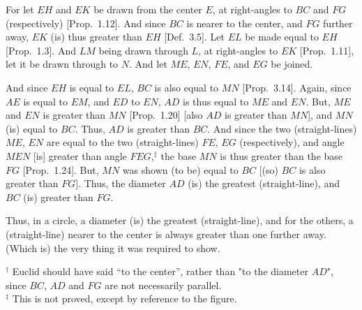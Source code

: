 \begin{Parallel}{}{}
{For let $EH$ and $EK$ be drawn from the center $E$, at right-angles
to $BC$ and $FG$ (respectively) [Prop.~1.12]. And since $BC$ is nearer to the center, and $FG$ further away, $EK$ (is) thus greater than $EH$ [Def.~3.5]. Let $EL$ be made equal to
$EH$ [Prop.~1.3]. And $LM$ being drawn through $L$, at right-angles to $EK$ [Prop.~1.11], 
let it be drawn through to $N$. And let $ME$, $EN$, $FE$, and $EG$
be joined.

And since $EH$ is equal to $EL$, $BC$ is also equal to $MN$ [Prop.~3.14]. Again,
since $AE$ is equal to $EM$, and $ED$ to $EN$, $AD$ is thus equal to $ME$ and $EN$.
But, $ME$ and $EN$ is greater than $MN$ [Prop.~1.20] [also $AD$ is greater than $MN$], and $MN$ (is) equal to $BC$. Thus, $AD$ is greater than $BC$. And since
the two (straight-lines) $ME$, $EN$ are equal to the two (straight-lines) $FE$, $EG$ (respectively),
and angle $MEN$ [is] greater than angle $FEG$,$^\ddag$ the base $MN$ is thus
greater than the base $FG$ [Prop.~1.24]. But, $MN$ was shown (to be) equal to $BC$ [(so) $BC$ is also greater than $FG$]. Thus, the diameter $AD$ (is) the
greatest (straight-line), and $BC$ (is) greater than $FG$.

\epsfysize=2.2in
\centerline{}

Thus, in a circle, a diameter (is) the greatest (straight-line), and for 
the others, a (straight-line) nearer to the center is always greater than one further away. (Which is) the very thing it was required to show.}
\end{Parallel}
{\footnotesize \noindent$^\dag$ Euclid should have said ``to the center'', rather than "to the diameter $AD$", since $BC$, $AD$ and $FG$ are not necessarily parallel.\\
$^\ddag$  This is not proved,
except by reference to the figure.}

